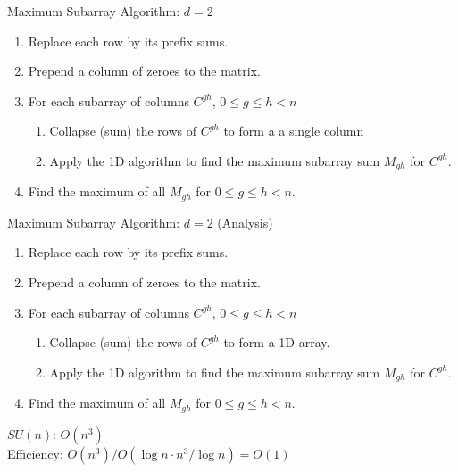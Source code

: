 \documentclass{beamer}
\newcommand{\fadetext}[1]{\textcolor{fade}{#1}}
\begin{document}
\begin{frame}{Maximum Subarray Algorithm: $d = 2$}
  
  \begin{enumerate}
    \item Replace each row by its prefix sums.
    \item Prepend a column of zeroes to the matrix.
    \item For each subarray of columns $C^{gh}$, $0 \leq g \leq h < n$ \begin{enumerate}
      \item Collapse (sum) the rows of $C^{gh}$ to form a a single column
      \item Apply the 1D algorithm to find the maximum subarray sum $M_{gh}$ for $C^{gh}$.
    \end{enumerate}
    \item Find the maximum of all $M_{gh}$ for $0 \leq g \leq h < n$.
  \end{enumerate}
\end{frame}

\beamerdefaultoverlayspecification{<*>}

\begin{frame}{Maximum Subarray Algorithm: $d = 2$ (Analysis)}
  \begin{enumerate}
    \item \fadetext{Replace each row by its prefix sums.} 
    \item \fadetext{Prepend a column of zeroes to the matrix.} 
    \item \fadetext{For each subarray of columns $C^{gh}$, $0 \leq g \leq h < n$} \begin{enumerate}
      \item \fadetext{Collapse (sum) the rows of $C^{gh}$ to form a 1D array.} 
      \item \fadetext{Apply the 1D algorithm to find the maximum subarray sum $M_{gh}$ for $C^{gh}$.} 
    \end{enumerate}
    \item \fadetext{Find the maximum of all $M_{gh}$ for $0 \leq g \leq h < n$.} 
  \end{enumerate}

    {
  $SU(n)$: $O(n^3)$ \\
  }  {
  Efficiency: $O(n^3)/O(\log n \cdot n^3/\log n) = O(1)$
  }
\end{frame}
\end{document}
